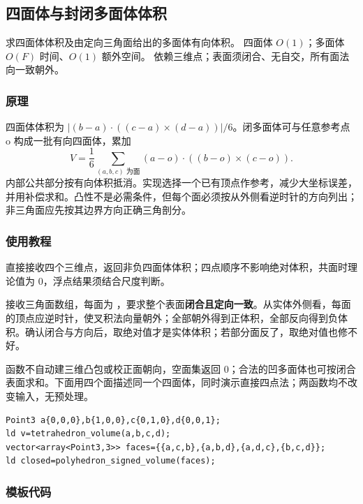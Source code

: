 \subsection{四面体与封闭多面体体积}
\label{geo:volume}
\AlgorithmInfo
    {求四面体体积及由定向三角面给出的多面体有向体积。}
    {四面体 $O(1)$；多面体 $O(F)$ 时间、$O(1)$ 额外空间。}
    {依赖三维点；表面须闭合、无自交，所有面法向一致朝外。}
\subsubsection*{原理}

四面体体积为 $|(b-a)\cdot((c-a)\times(d-a))|/6$。闭多面体可与任意参考点 o 构成一批有向四面体，累加
\[
 V=\frac16\sum_{(a,b,c)\text{ 为面}}(a-o)\cdot((b-o)\times(c-o)).
\]
内部公共部分按有向体积抵消。实现选择一个已有顶点作参考，减少大坐标误差，并用补偿求和。凸性不是必需条件，但每个面必须按从外侧看逆时针的方向列出；非三角面应先按其边界方向正确三角剖分。

\subsubsection*{使用教程}
 直接接收四个三维点，返回非负四面体体积；四点顺序不影响绝对体积，共面时理论值为 0，浮点结果须结合尺度判断。

 接收三角面数组，每面为 ，要求整个表面\textbf{闭合且定向一致}。从实体外侧看，每面的顶点应逆时针，使叉积法向量朝外；全部朝外得到正体积，全部反向得到负体积。确认闭合与方向后，取绝对值才是实体体积；若部分面反了，取绝对值也修不好。

函数不自动建三维凸包或校正面朝向，空面集返回 0；合法的凹多面体也可按闭合表面求和。下面用四个面描述同一个四面体，同时演示直接四点法；两函数均不改变输入，无预处理。
\begin{lstlisting}[style=mtycpp,numbers=none]
Point3 a{0,0,0},b{1,0,0},c{0,1,0},d{0,0,1};
ld v=tetrahedron_volume(a,b,c,d);
vector<array<Point3,3>> faces={{a,c,b},{a,b,d},{a,d,c},{b,c,d}};
ld closed=polyhedron_signed_volume(faces);
\end{lstlisting}
\subsubsection*{模板代码}
